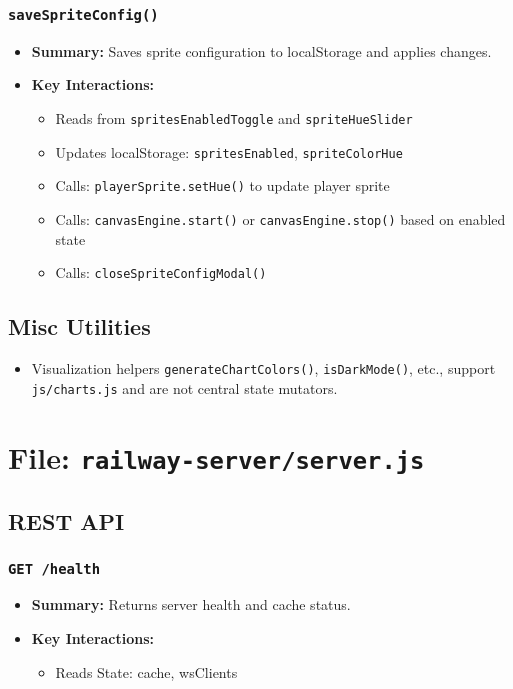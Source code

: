 \documentclass[11pt,letterpaper]{article}
\begin{document}
\subsubsection{\texttt{saveSpriteConfig()}}
\begin{itemize}
    \item \textbf{Summary:} Saves sprite configuration to localStorage and applies changes.
    \item \textbf{Key Interactions:}
    \begin{itemize}
        \item Reads from \texttt{spritesEnabledToggle} and \texttt{spriteHueSlider}
        \item Updates localStorage: \texttt{spritesEnabled}, \texttt{spriteColorHue}
        \item Calls: \texttt{playerSprite.setHue()} to update player sprite
        \item Calls: \texttt{canvasEngine.start()} or \texttt{canvasEngine.stop()} based on enabled state
        \item Calls: \texttt{closeSpriteConfigModal()}
    \end{itemize}
\end{itemize}

\subsection{Misc Utilities}
\begin{itemize}
    \item Visualization helpers \texttt{generateChartColors()}, \texttt{isDarkMode()}, etc., support \texttt{js/charts.js} and are not central state mutators.
\end{itemize}

\section{File: \texttt{railway-server/server.js}}

\subsection{REST API}

\subsubsection{\texttt{GET /health}}
\begin{itemize}
    \item \textbf{Summary:} Returns server health and cache status.
    \item \textbf{Key Interactions:}
    \begin{itemize}
        \item Reads State: cache, wsClients
    \end{itemize}
\end{itemize}
\end{document}
